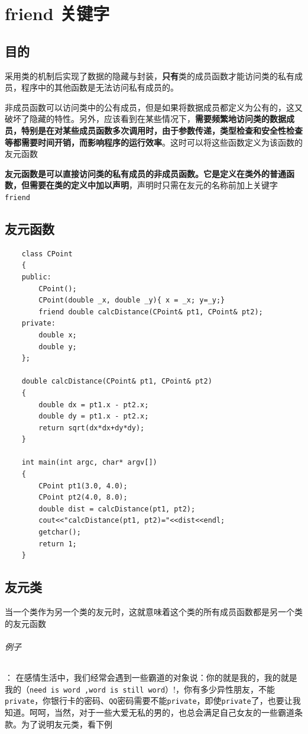 \documentclass[UTF8,a4paper,12pt]{ctexbook} %
\begin{document}
\chapter{friend 关键字}
\section{目的}
		    采用类的机制后实现了数据的隐藏与封装，\textbf{只有}类的成员函数才能访问类的私有成员，程序中的其他函数是无法访问私有成员的。
	        
	        非成员函数可以访问类中的公有成员，但是如果将数据成员都定义为公有的，这又破坏了隐藏的特性。另外，应该看到在某些情况下，\textbf{需要频繁地访问类的数据成员，特别是在对某些成员函数多次调用时，由于参数传递，类型检查和安全性检查等都需要时间开销，而影响程序的运行效率}。这时可以将这些函数定义为该函数的友元函数
        
		    \textbf{友元函数是可以直接访问类的私有成员的非成员函数。它是定义在类外的普通函数，但需要在类的定义中加以声明}，声明时只需在友元的名称前加上关键字\verb|friend|
		    
\section{友元函数}
		    \begin{lstlisting}
	class CPoint
	{
	public:
		CPoint();
		CPoint(double _x, double _y){ x = _x; y=_y;}
		friend double calcDistance(CPoint& pt1, CPoint& pt2);
	private:
		double x;
		double y;
	};
	
	double calcDistance(CPoint& pt1, CPoint& pt2)
	{
		double dx = pt1.x - pt2.x;
		double dy = pt1.x - pt2.x;
		return sqrt(dx*dx+dy*dy);
	}
	
	int main(int argc, char* argv[])
	{
		CPoint pt1(3.0, 4.0);
		CPoint pt2(4.0, 8.0);
		double dist = calcDistance(pt1, pt2);
		cout<<"calcDistance(pt1, pt2)="<<dist<<endl;
		getchar();
		return 1;
	}		    
		    \end{lstlisting}
		    
\section{友元类}
			    当一个类作为另一个类的友元时，这就意味着这个类的所有成员函数都是另一个类的友元函数
		    
		    \subparagraph{例子}：
			    在感情生活中，我们经常会遇到一些霸道的对象说：你的就是我的，我的就是我的（\verb|need is word ,word is still word|）!，你有多少异性朋友，不能\verb|private|，你银行卡的密码、\verb|QQ|密码需要不能\verb|private|，即使\verb|private|了，也要让我知道。呵呵，当然，对于一些大爱无私的男的，也总会满足自己女友的一些霸道条款。为了说明友元类，看下例
		    
\end{document}
